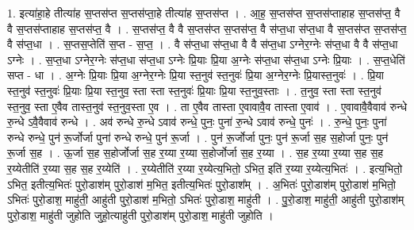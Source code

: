 \documentclass[17pt]{extarticle}
\begin{document}
1. इत्या॑हा॒हे तीत्या॑ह स॒प्तस॑प्त स॒प्तस॑प्ता॒हे तीत्या॑ह स॒प्तस॑प्त । . आ॒ह॒ स॒प्तस॑प्त स॒प्तस॑प्ताहाह स॒प्तस॑प्त॒ वै वै स॒प्तस॑प्ताहाह स॒प्तस॑प्त॒ वै । . स॒प्तस॑प्त॒ वै वै स॒प्तस॑प्त स॒प्तस॑प्त॒ वै स॑प्त॒धा स॑प्त॒धा वै स॒प्तस॑प्त स॒प्तस॑प्त॒ वै स॑प्त॒धा । . स॒प्तस॒प्तेति॑ स॒प्त - स॒प्त॒ । . वै स॑प्त॒धा स॑प्त॒धा वै वै स॑प्त॒धा ऽग्नेर॒ग्नेः स॑प्त॒धा वै वै स॑प्त॒धा ऽग्नेः । . स॒प्त॒धा ऽग्नेर॒ग्नेः स॑प्त॒धा स॑प्त॒धा ऽग्नेः प्रि॒याः प्रि॒या अ॒ग्नेः स॑प्त॒धा स॑प्त॒धा ऽग्नेः प्रि॒याः । . स॒प्त॒धेति॑ सप्त - धा । . अ॒ग्नेः प्रि॒याः प्रि॒या अ॒ग्नेर॒ग्नेः प्रि॒या स्त॒नुव॑ स्त॒नुवः॑ प्रि॒या अ॒ग्नेर॒ग्नेः प्रि॒यास्त॒नुवः॑ । . प्रि॒या स्त॒नुव॑ स्त॒नुवः॑ प्रि॒याः प्रि॒या स्त॒नुव॒ स्ता स्ता स्त॒नुवः॑ प्रि॒याः प्रि॒या स्त॒नुव॒स्ताः । . त॒नुव॒ स्ता स्ता स्त॒नुव॑ स्त॒नुव॒ स्ता ए॒वैव तास्त॒नुव॑ स्त॒नुव॒स्ता ए॒व । . ता ए॒वैव तास्ता ए॒वावावै॒व तास्ता ए॒वाव॑ । . ए॒वावावै॒वैवाव॑ रुन्धे रु॒न्धे ऽवै॒वैवाव॑ रुन्धे । . अव॑ रुन्धे रु॒न्धे ऽवाव॑ रुन्धे॒ पुनः॒ पुना॑ रु॒न्धे ऽवाव॑ रुन्धे॒ पुनः॑ । . रु॒न्धे॒ पुनः॒ पुना॑ रुन्धे रुन्धे॒ पुन॑ रू॒र्जोर्जा पुना॑ रुन्धे रुन्धे॒ पुन॑ रू॒र्जा । . पुन॑ रू॒र्जोर्जा पुनः॒ पुन॑ रू॒र्जा स॒ह स॒होर्जा पुनः॒ पुन॑ रू॒र्जा स॒ह । . ऊ॒र्जा स॒ह स॒होर्जोर्जा स॒ह र॒य्या र॒य्या स॒होर्जोर्जा स॒ह र॒य्या । . स॒ह र॒य्या र॒य्या स॒ह स॒ह र॒य्येतीति॑ र॒य्या स॒ह स॒ह र॒य्येति॑ । . र॒य्येतीति॑ र॒य्या र॒य्येत्य॒भितो॒ ऽभित॒ इति॑ र॒य्या र॒य्येत्य॒भितः॑ । . इत्य॒भितो॒ ऽभित॒ इतीत्य॒भितः॑ पुरो॒डाश॑म् पुरो॒डाश॑ म॒भित॒ इतीत्य॒भितः॑ पुरो॒डाश᳚म् । . अ॒भितः॑ पुरो॒डाश॑म् पुरो॒डाश॑ म॒भितो॒ ऽभितः॑ पुरो॒डाश॒ माहु॑ती॒ आहु॑ती पुरो॒डाश॑ म॒भितो॒ ऽभितः॑ पुरो॒डाश॒ माहु॑ती । . पु॒रो॒डाश॒ माहु॑ती॒ आहु॑ती पुरो॒डाश॑म् पुरो॒डाश॒ माहु॑ती जुहोति जुहो॒त्याहु॑ती पुरो॒डाश॑म् पुरो॒डाश॒ माहु॑ती जुहोति । \newline
\end{document}

